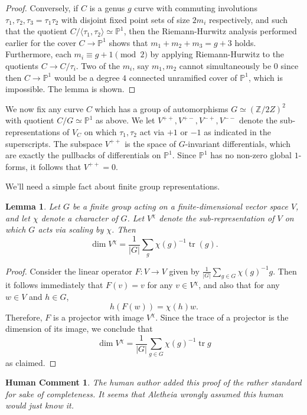 \documentclass[reqno]{amsart}
\theoremstyle{plain}
\newtheorem{lemma}[theorem]{Lemma}
\newtheorem{commentary}[theorem]{Human Comment}
\renewcommand{\P}{\mathbb{P}}
\newcommand{\Z}{\mathbb{Z}}
\DeclareMathOperator{\tr}{tr}
\begin{document}
\begin{proof}
 Conversely, if $C$ is a genus $g$ curve with commuting involutions $\tau_1, \tau_2,
 \tau_3 = \tau_1 \tau_2$ with disjoint fixed point sets of size $2m_{i}$
 respectively, and such that the quotient $C/\langle \tau_1, \tau_2 \rangle
 \simeq \P^{1}$, then the Riemann-Hurwitz analysis performed earlier for the
 cover $C \to \P^{1}$ shows that
 $m_1 + m_2 + m_3 = g+3$ holds. Furthermore, each $m_{i} \equiv g+1 \pmod 2$ by
 applying Riemann-Hurwitz to the quotients $C \to C /\tau_i$. Two of the $m_i$, say $m_1, m_2$ cannot simultaneously be $0$ since then $C \to
 \P^{1}$ would be a degree $4$ connected unramified
 cover of $\P^{1}$, which is impossible. The lemma is shown. 
\end{proof}


We now fix any curve $C$ which has a group of automorphisms $G \simeq
(\Z/2Z)^{2}$ with quotient $C/G \simeq \P^{1}$ as above. We
let $V^{++}, V^{+-}, V^{-+}, V^{--}$ denote the sub-representations of $V_{C}$ on
which $\tau_{1},\tau_{2}$ act via $+1$ or $-1$ as indicated in the superscripts. The subspace $V^{++}$ is the space  
of $G$-invariant differentials, which are exactly the pullbacks of differentials on $\P^{1}$. Since
$\P^{1}$ has no non-zero global $1$-forms, it follows that $V^{++} = 0$. 


We'll need a simple fact about finite group representations.
\begin{lemma}
  \label{lemma:character} Let $G$ be a finite group acting on a
  finite-dimensional vector space $V$, and let $\chi$ denote a character of $G$.
  Let $V^{\chi}$ denote the sub-representation of $V$ on which $G$ acts via
 scaling by $\chi$.  Then 
 \[\dim V^{\chi} = \frac{1}{|G|}\sum_{g}\chi(g)^{-1}\tr(g).\]
\end{lemma}

\begin{proof}
  Consider the linear operator $F: V \to V$ given by $\frac{1}{|G|}\sum_{g \in
  G}\chi(g)^{-1}g$. Then it follows immediately that $F(v) = v$ for any $v \in V^{\chi}$,
   and also that for any $w \in V$ and $h \in G$, \[h(F(w)) = \chi(h)w.\] Therefore, $F$ is a projector with image $V^{\chi}$. 
  Since the trace of a projector is the dimension of its image, we conclude that \[\dim V^{\chi} = \frac{1}{|G|}\sum_{g \in G}\chi(g)^{-1}\tr{g}\] as claimed.
\end{proof}

\begin{commentary}
  \label{commentary:finiterep} The human author added this proof of the rather
  standard  for sake of completeness.  It
  seems that Aletheia wrongly assumed this human would just know it. 
\end{commentary}
\end{document}
